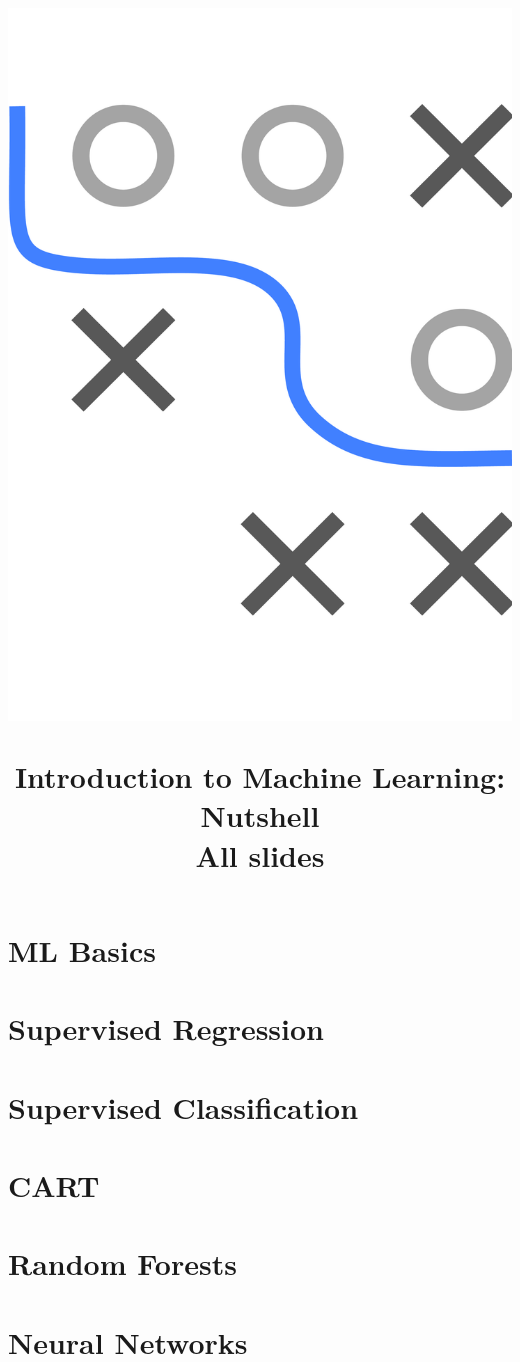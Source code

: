 \documentclass[11pt,compress]{beamer}
\title{
\centerline{\includegraphics[width=0.25\paperwidth,]{../../style/logo.pdf}}
\medskip
Introduction to Machine Learning: Nutshell \\
\medskip
\small All slides
}
\begin{document}

\begin{frame}
\maketitle
\end{frame}



\section{ML Basics}


\section{Supervised Regression}


\section{Supervised Classification}


\section{CART}


\section{Random Forests}


\section{Neural Networks}



%
\end{document}
